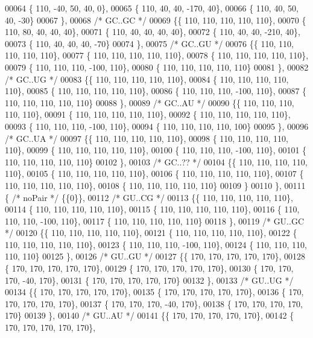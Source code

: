 \begin{DoxyCode}
00064 \{ 110, -40,  50,  40,   0\},
00065 \{ 110,  40,  40, -170,  40\},
00066 \{ 110,  40,  50,  40, -30\}
00067 \},
00068 \textcolor{comment}{/* GC..GC */}
00069 \{\{ 110, 110, 110, 110, 110\},
00070 \{ 110,  80,  40,  40,  40\},
00071 \{ 110,  40,  40,  40,  40\},
00072 \{ 110,  40,  40, -210,  40\},
00073 \{ 110,  40,  40,  40, -70\}
00074 \},
00075 \textcolor{comment}{/* GC..GU */}
00076 \{\{ 110, 110, 110, 110, 110\},
00077 \{ 110, 110, 110, 110, 110\},
00078 \{ 110, 110, 110, 110, 110\},
00079 \{ 110, 110, 110, -100, 110\},
00080 \{ 110, 110, 110, 110, 110\}
00081 \},
00082 \textcolor{comment}{/* GC..UG */}
00083 \{\{ 110, 110, 110, 110, 110\},
00084 \{ 110, 110, 110, 110, 110\},
00085 \{ 110, 110, 110, 110, 110\},
00086 \{ 110, 110, 110, -100, 110\},
00087 \{ 110, 110, 110, 110, 110\}
00088 \},
00089 \textcolor{comment}{/* GC..AU */}
00090 \{\{ 110, 110, 110, 110, 110\},
00091 \{ 110, 110, 110, 110, 110\},
00092 \{ 110, 110, 110, 110, 110\},
00093 \{ 110, 110, 110, -100, 110\},
00094 \{ 110, 110, 110, 110, 100\}
00095 \},
00096 \textcolor{comment}{/* GC..UA */}
00097 \{\{ 110, 110, 110, 110, 110\},
00098 \{ 110, 110, 110, 110, 110\},
00099 \{ 110, 110, 110, 110, 110\},
00100 \{ 110, 110, 110, -100, 110\},
00101 \{ 110, 110, 110, 110, 110\}
00102 \},
00103 \textcolor{comment}{/* GC..?? */}
00104 \{\{ 110, 110, 110, 110, 110\},
00105 \{ 110, 110, 110, 110, 110\},
00106 \{ 110, 110, 110, 110, 110\},
00107 \{ 110, 110, 110, 110, 110\},
00108 \{ 110, 110, 110, 110, 110\}
00109 \}
00110 \},
00111 \{ \textcolor{comment}{/* noPair */} \{\{0\}\},
00112 \textcolor{comment}{/* GU..CG */}
00113 \{\{ 110, 110, 110, 110, 110\},
00114 \{ 110, 110, 110, 110, 110\},
00115 \{ 110, 110, 110, 110, 110\},
00116 \{ 110, 110, 110, -100, 110\},
00117 \{ 110, 110, 110, 110, 110\}
00118 \},
00119 \textcolor{comment}{/* GU..GC */}
00120 \{\{ 110, 110, 110, 110, 110\},
00121 \{ 110, 110, 110, 110, 110\},
00122 \{ 110, 110, 110, 110, 110\},
00123 \{ 110, 110, 110, -100, 110\},
00124 \{ 110, 110, 110, 110, 110\}
00125 \},
00126 \textcolor{comment}{/* GU..GU */}
00127 \{\{ 170, 170, 170, 170, 170\},
00128 \{ 170, 170, 170, 170, 170\},
00129 \{ 170, 170, 170, 170, 170\},
00130 \{ 170, 170, 170, -40, 170\},
00131 \{ 170, 170, 170, 170, 170\}
00132 \},
00133 \textcolor{comment}{/* GU..UG */}
00134 \{\{ 170, 170, 170, 170, 170\},
00135 \{ 170, 170, 170, 170, 170\},
00136 \{ 170, 170, 170, 170, 170\},
00137 \{ 170, 170, 170, -40, 170\},
00138 \{ 170, 170, 170, 170, 170\}
00139 \},
00140 \textcolor{comment}{/* GU..AU */}
00141 \{\{ 170, 170, 170, 170, 170\},
00142 \{ 170, 170, 170, 170, 170\},

\end{DoxyCode}
